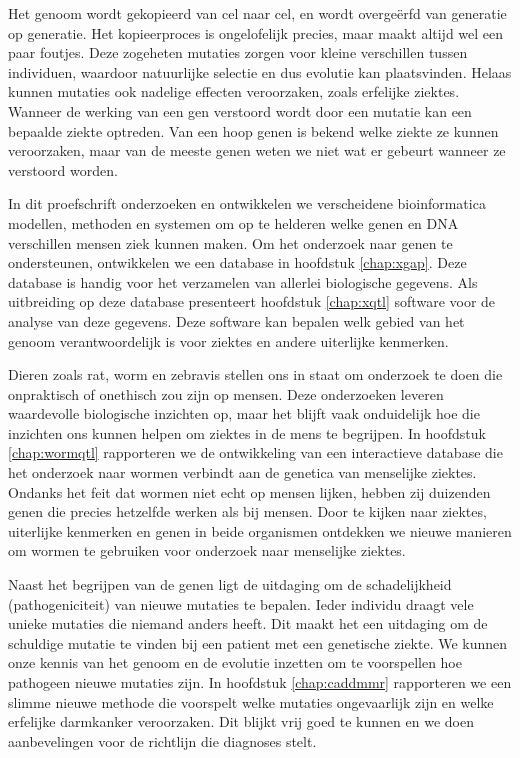 \begin{appendices}
Het genoom wordt gekopieerd van cel naar cel, en wordt overgeërfd van generatie op generatie.
Het kopieerproces is ongelofelijk precies, maar maakt altijd wel een paar foutjes.
Deze zogeheten mutaties zorgen voor kleine verschillen tussen individuen, waardoor natuurlijke selectie en dus evolutie kan plaatsvinden.
Helaas kunnen mutaties ook nadelige effecten veroorzaken, zoals erfelijke ziektes.
Wanneer de werking van een gen verstoord wordt door een mutatie kan een bepaalde ziekte optreden.
Van een hoop genen is bekend welke ziekte ze kunnen veroorzaken, maar van de meeste genen weten we niet wat er gebeurt wanneer ze verstoord worden.

In dit proefschrift onderzoeken en ontwikkelen we verscheidene bioinformatica modellen, methoden en systemen om op te helderen welke genen en DNA verschillen mensen ziek kunnen maken.
Om het onderzoek naar genen te ondersteunen, ontwikkelen we een database in hoofdstuk \ref{chap:xgap}.
Deze database is handig voor het verzamelen van allerlei biologische gegevens.
Als uitbreiding op deze database presenteert hoofdstuk \ref{chap:xqtl} software voor de analyse van deze gegevens.
Deze software kan bepalen welk gebied van het genoom verantwoordelijk is voor ziektes en andere uiterlijke kenmerken.

Dieren zoals rat, worm en zebravis stellen ons in staat om onderzoek te doen die onpraktisch of onethisch zou zijn op mensen.
Deze onderzoeken leveren waardevolle biologische inzichten op, maar het blijft vaak onduidelijk hoe die inzichten ons kunnen helpen om ziektes in de mens te begrijpen.
In hoofdstuk \ref{chap:wormqtl} rapporteren we de ontwikkeling van een interactieve database die het onderzoek naar wormen verbindt aan de genetica van menselijke ziektes.
Ondanks het feit dat wormen niet echt op mensen lijken, hebben zij duizenden genen die precies hetzelfde werken als bij mensen.
Door te kijken naar ziektes, uiterlijke kenmerken en genen in beide organismen ontdekken we nieuwe manieren om wormen te gebruiken voor onderzoek naar menselijke ziektes.

Naast het begrijpen van de genen ligt de uitdaging om de schadelijkheid (pathogeniciteit) van nieuwe mutaties te bepalen.
Ieder individu draagt vele unieke mutaties die niemand anders heeft.
Dit maakt het een uitdaging om de schuldige mutatie te vinden bij een patient met een genetische ziekte.
We kunnen onze kennis van het genoom en de evolutie inzetten om te voorspellen hoe pathogeen nieuwe mutaties zijn.
In hoofdstuk \ref{chap:caddmmr} rapporteren we een slimme nieuwe methode die voorspelt welke mutaties ongevaarlijk zijn en welke erfelijke darmkanker veroorzaken.
Dit blijkt vrij goed te kunnen en we doen aanbevelingen voor de richtlijn die diagnoses stelt.


\end{appendices}
